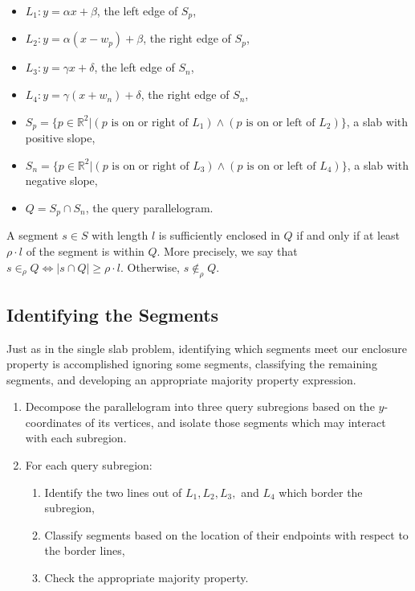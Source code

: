 \begin{itemize}
 \item $L_1 : y = \alpha x + \beta$, the left edge of $S_p$,

 \item $L_2 : y = \alpha (x - w_p) + \beta$, the right edge of $S_p$,

 \item $L_3 : y = \gamma x + \delta$, the left edge of $S_n$,

 \item $L_4 : y = \gamma (x + w_n) + \delta$, the right edge of $S_n$,

 \item $S_p = \{ p \in \mathbb{R}^2 | (p \text{ is on or right of } L_1) \wedge (p \text{ is on or left of } L_2) \}$, a slab with positive slope,

 \item $S_n = \{ p \in \mathbb{R}^2 | (p \text{ is on or right of } L_3) \wedge (p \text{ is on or left of } L_4) \}$, a slab with negative slope,

 \item $Q = S_p \cap S_n$, the query parallelogram.

\end{itemize}

A segment $s \in S$ with length $l$ is sufficiently enclosed in $Q$ if and only if at least $\rho \cdot l$ of the segment is within $Q$. More precisely, we say that $s \in_\rho Q \Leftrightarrow |s \cap Q| \geq \rho \cdot l$. Otherwise, $s \not \in_\rho Q$.


\subsection{Identifying the Segments}
\label{:slabs:two:approach}

Just as in the single slab problem, identifying which segments meet our enclosure property is accomplished ignoring some segments, classifying the remaining segments, and developing an appropriate majority property expression.

\begin{enumerate}
 \item Decompose the parallelogram into three query subregions based on the $y$-coordinates of its vertices, and isolate those segments which may interact with each subregion.

 \item For each query subregion:
 \begin{enumerate}
  \item Identify the two lines out of $L_1, L_2, L_3,$ and $L_4$ which border the subregion,
  \item Classify segments based on the location of their endpoints with respect to the border lines,
  \item Check the appropriate majority property.
 \end{enumerate}
\end{enumerate}

